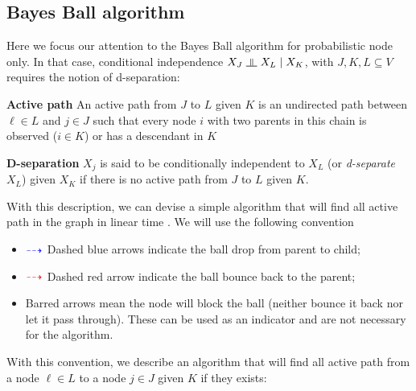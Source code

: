 \documentclass{article}
\numberwithin{equation}{section}
\newcommand{\s}{\hspace{0.1cm}}
\newcommand{\indep}{\s \rotatebox[origin=c]{90}{$\models$}\s }
\theoremstyle{named}
\begin{document}
\subsection{Bayes Ball algorithm}
Here we focus our attention to the Bayes Ball algorithm for probabilistic node only. In that 
case, conditional independence $X_J \indep X_L \mid X_K$, with $J,K,L \subseteq V$ requires 
the notion of d-separation:
\begin{description}
        \item{\textbf{Active path}} An active path from $J$ to $L$ given $K$ is 
                an undirected path between $\ell \in L$ and $j \in J$ such that every 
                node $i$ with two parents in this chain is observed ($i \in K$) or 
                has a descendant in $K$
        \item{\textbf{D-separation}} $X_j$ is said to be conditionally independent to 
                $X_L$ (or 
                \textit{d-separate} $X_L$) given $X_K$ if there is no active path 
                from $J$ to $L$ given $K$.
\end{description}
With this description, we can devise a simple algorithm that will find all active 
path in the graph in linear time \cite{BB}. We will use the following convention 
\begin{itemize}
        \item $\color{blue} \dashrightarrow $ Dashed blue arrows indicate the ball drop from parent to child;
        \item $\color{red} \dashrightarrow$ Dashed red arrow indicate the ball bounce back to the 
                parent;
        \item Barred arrows mean the node will block the ball (neither bounce it back 
                nor let it pass through). These can be used as an indicator and are not 
                necessary for the algorithm.
\end{itemize}
With this convention, we describe an algorithm that will find all active path 
from a node $\ell \in L$ to a node $j \in J$ given 
$K$ if they exists:
\end{document}

